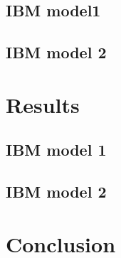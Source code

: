 \documentclass[11pt]{article}
\begin{document}
\subsection{IBM model1}

\subsection{IBM model 2}

\section{Results}

\subsection{IBM model 1}

\subsection{IBM model 2}

\section{Conclusion}
\end{document}
